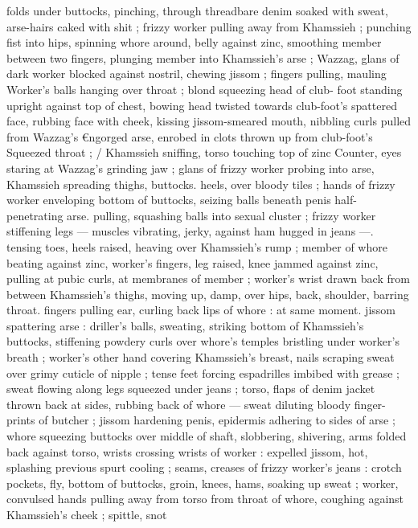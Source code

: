folds under buttocks, pinching, through threadbare denim soaked 
with sweat, arse-hairs caked with shit ; frizzy worker pulling away 
from Khamssieh ; punching fist into hips, spinning whore around, 
belly against zinc, smoothing member between two fingers, plunging 
member into Khamssieh's arse ; Wazzag, glans of dark worker 
blocked against nostril, chewing jissom ; fingers pulling, mauling 
Worker's balls hanging over throat ; blond squeezing head of club- 
foot standing upright against top of chest, bowing head twisted 
towards club-foot's spattered face, rubbing face with cheek, kissing 
jissom-smeared mouth, nibbling curls pulled from Wazzag's 
€ngorged arse, enrobed in clots thrown up from club-foot's 
Squeezed throat ; {\slash} Khamssieh sniffing, torso touching top of zinc 
Counter, eyes staring at Wazzag's grinding jaw ; glans of frizzy 
worker probing into arse, Khamssieh spreading thighs, buttocks. 
heels, over bloody tiles ; hands of frizzy worker enveloping bottom 
of buttocks, seizing balls beneath penis half-penetrating arse. 
pulling, squashing balls into sexual cluster ; frizzy worker stiffening 
legs --- muscles vibrating, jerky, against ham hugged in jeans ---. 
tensing toes, heels raised, heaving over Khamssieh's rump ; member 
of whore beating against zinc, worker's fingers, leg raised, knee 
jammed against zinc, pulling at pubic curls, at membranes of 
member ; worker's wrist drawn back from between Khamssieh's 
thighs, moving up, damp, over hips, back, shoulder, barring throat. 
fingers pulling ear, curling back lips of whore : at same moment. 
jissom spattering arse : driller's balls, sweating, striking bottom of 
Khamssieh's buttocks, stiffening powdery curls over whore's temples 
bristling under worker's breath ; worker's other hand covering 
Khamssieh's breast, nails scraping sweat over grimy cuticle of nipple 
; tense feet forcing espadrilles imbibed with grease ; sweat flowing 
along legs squeezed under jeans ; torso, flaps of denim jacket 
thrown back at sides, rubbing back of whore --- sweat diluting 
bloody finger-prints of butcher ; jissom hardening penis, epidermis 
adhering to sides of arse ; whore squeezing buttocks over middle of 
shaft, slobbering, shivering, arms folded back against torso, wrists 
crossing wrists of worker : expelled jissom, hot, splashing previous 
spurt cooling ; seams, creases of frizzy worker's jeans : crotch 
pockets, fly, bottom of buttocks, groin, knees, hams, soaking up 
sweat ; worker, convulsed hands pulling away from torso from throat 
of whore, coughing against Khamssieh's cheek ; spittle, snot 
